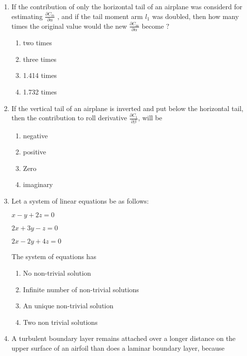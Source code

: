 \documentclass[journal]{IEEEtran}
\begin{document}
\begin{enumerate}[start=35]
\item If the contribution of only the horizontal tail of an airplane was considerd for estimating $\frac{\partial C_m}{\partial \alpha}$ , and if the tail moment arm $l_1$  was doubled, then how many times the original value would the new $\frac{\partial C_m}{\partial \alpha}$ become $?$
\begin{multicols}{4}
    \begin{enumerate}
        \item two times
        \item three times
        \item 1.414 times 
        \item 1.732 times
    \end{enumerate}
\end{multicols}
\item If the vertical tail of an airplane is inverted and put below the horizontal tail, then the contribution to roll derivative $\frac{\partial C_1}{\partial \beta}$, will be 
\begin{multicols}{2}
    \begin{enumerate}
        \item negative 
        \item positive 
        \item Zero
        \item imaginary
    \end{enumerate}
\end{multicols}
\item  Let a system of linear equations be as follows:

\hspace{4cm} $x-y+2z=0$

\hspace{4cm} $2x+3y-z=0$

\hspace{4cm} $2x-2y+4z=0$

The system of equations has
\begin{multicols}{2}
    \begin{enumerate}
        \item No non-trivial solution
        \item Infinite number of non-trivial solutions
        \item An unique non-trivial solution
        \item Two non trivial solutions 
    \end{enumerate}
\end{multicols}
\item A turbulent boundary layer remains attached over a longer distance on the upper surface of an airfoil than does a laminar boundary layer, because


\end{enumerate}
\end{document}
